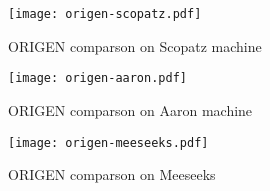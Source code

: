 \begin{figure}[!ht]
\centering
\texttt{[image: origen-scopatz.pdf]}
\caption{ORIGEN comparson on Scopatz machine}
\label{fig:origen-scopatz}
\end{figure}

\begin{figure}[!ht]
\centering
\texttt{[image: origen-aaron.pdf]}
\caption{ORIGEN comparson on Aaron machine}
\label{fig:origen-aaron}
\end{figure}

\begin{figure}[!ht]
\centering
\texttt{[image: origen-meeseeks.pdf]}
\caption{ORIGEN comparson on Meeseeks}
\label{fig:origen-meeseeks}
\end{figure}
